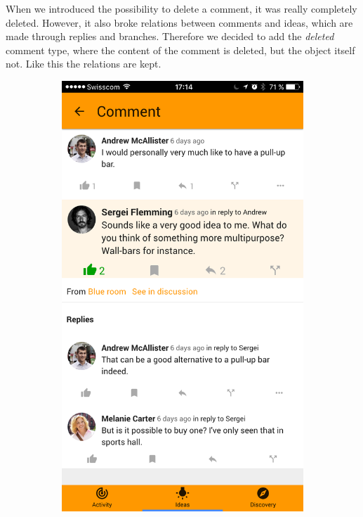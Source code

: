 \documentclass[a4paper,12pt, oneside]{article}
\begin{document}
When we introduced the possibility to delete a comment, it was really completely deleted.
However, it also broke relations between comments and ideas, which are made through replies and branches.
Therefore we decided to add the \emph{deleted} comment type, where the content of the comment is deleted, but the object itself not.
Like this the relations are kept.

\begin{figure}[!htb]
    \null\hfill
    \begin{subfigure}[t]{.32\textwidth}
        \centering
        \includegraphics[width=\textwidth]{images/commentView.png}

\end{subfigure}
\end{figure}
\end{document}
